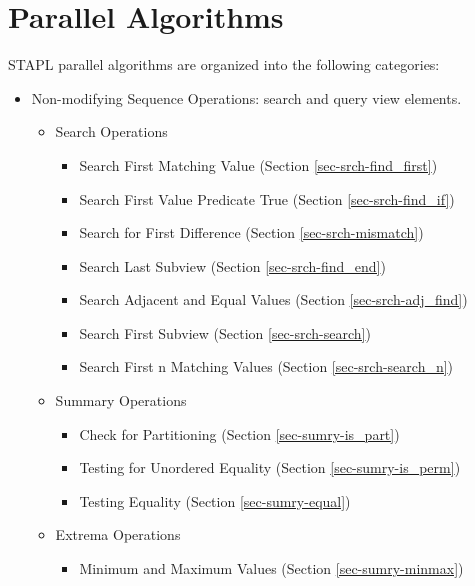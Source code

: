 \chapter{Parallel Algorithms}

STAPL parallel algorithms are organized into the following categories:

\begin{itemize}

\item
Non-modifying Sequence Operations:
search and query view elements.

\begin{itemize}

\item 
Search Operations

\begin{itemize}
\item 
Search First Matching Value (Section \ref{sec-srch-find_first})
\item 
Search First Value Predicate True (Section \ref{sec-srch-find_if})
\item 
Search for First Difference (Section \ref{sec-srch-mismatch})
\item 
Search Last Subview (Section \ref{sec-srch-find_end})
\item 
Search Adjacent and Equal Values (Section \ref{sec-srch-adj_find})
\item 
Search First Subview (Section \ref{sec-srch-search})
\item 
Search First n Matching Values (Section \ref{sec-srch-search_n})
\end{itemize}

\item 
Summary Operations

\begin{itemize}
\item 
Check for Partitioning (Section \ref{sec-sumry-is_part})
\item 
Testing for Unordered Equality (Section \ref{sec-sumry-is_perm})
\item 
Testing Equality (Section \ref{sec-sumry-equal})
\end{itemize}

\item 
Extrema Operations

\begin{itemize}
\item 
Minimum and Maximum Values (Section \ref{sec-sumry-minmax})
\end{itemize}


\end{itemize}
\end{itemize}
